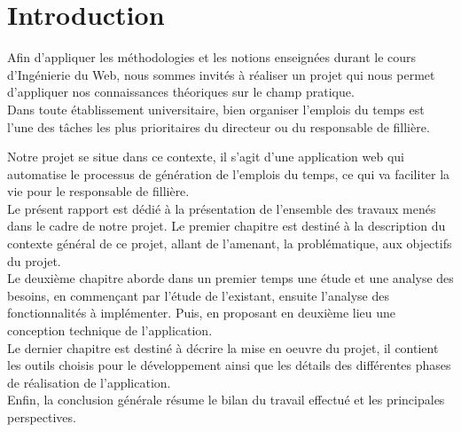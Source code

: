 \chapter*{Introduction}
Afin d’appliquer les méthodologies et les notions enseignées durant le cours d'Ingénierie du Web, nous sommes invités à réaliser un projet qui nous permet d’appliquer nos connaissances théoriques sur le champ pratique.\\

Dans toute établissement universitaire, bien organiser l'emplois du temps est l'une des tâches les plus prioritaires du directeur ou du responsable de fillière.

Notre projet se situe dans ce contexte, il s’agit d’une application web qui automatise le processus de génération de l'emplois du temps, ce qui va faciliter la vie pour le responsable de fillière.\\

Le présent rapport est dédié à la présentation de l'ensemble des travaux menés dans le cadre de notre projet. Le premier chapitre est destiné à la description du contexte général de ce projet, allant de l'amenant, la problématique, aux objectifs du projet.\\

Le deuxième chapitre aborde dans un premier temps une étude et une analyse des besoins, en commençant par l'étude de l'existant, ensuite l'analyse des fonctionnalités à implémenter. Puis, en proposant en deuxième lieu une conception technique de l'application.\\

Le dernier chapitre est destiné à décrire la mise en oeuvre du projet, il contient les outils choisis pour le développement ainsi que les détails des différentes phases de réalisation de l'application.\\

Enfin, la conclusion générale résume le bilan du travail effectué et les principales perspectives.\\
\newpage














% 
